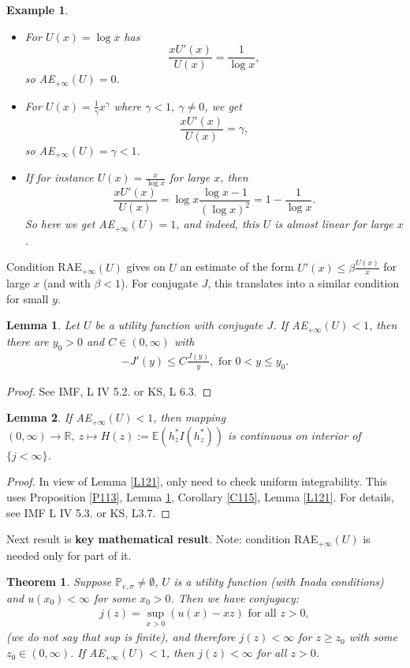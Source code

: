 \documentclass[12pt,a4paper, twoside]{article}
\newtheorem{lem}{Lemma}[section]
\newtheorem{thm}{Theorem}[section]
\newtheorem{exmp}{Example}[section]
\theoremstyle{definition}
\newcommand{\EE}{\mathbb{E}} %
\newcommand{\PP}{\mathbb{P}} %
\begin{document}
\newpage
\begin{exmp} \
\begin{itemize}
\item For $U(x)= \log x$ has $$\frac{x U'(x)}{U(x)}= \frac{1}{\log x},$$ so AE$_{+ \infty}(U)=0$. 
\item For $U(x)= \frac{1}{\gamma}x^\gamma$ where $\gamma <1, \ \gamma \neq 0$, we get $$ \frac{x U'(x)}{U(x)}= \gamma, $$ so AE$_{+ \infty}(U) = \gamma < 1$. 
\item If for instance $U(x)= \frac{x}{\log x}$ for large $x$, then $$ \frac{x U'(x)}{U(x)} = \log x \frac{\log x-1}{(\log x)^2}= 1- \frac{1}{\log x}.$$ So here we get AE$_{+ \infty}(U)=1$, and indeed, this $U$ is almost linear for large $x$.
\end{itemize}
\end{exmp}
Condition RAE$_{+ \infty}(U)$ gives on $U$ an estimate of the form $U'(x) \leq \beta \frac{U(x)}{x}$ for large $x$ (and with $\beta <1$). For conjugate $J$,  this translates into a similar condition for small $y$. 
\begin{lem} \label{L122} Let $U$ be a utility function with conjugate $J$. If AE$_{+ \infty} (U) < 1$, then there are $y_0 >0$ and $C \in (0, \infty)$ with 
\begin{align*}
-J'(y) \leq C \frac{J(y)}{y}, \text{ for } 0 < y \leq y_0.
\end{align*}
\end{lem}
\begin{proof}
See IMF, L IV 5.2. or KS, L 6.3.
\end{proof}
\begin{lem} \label{L123} If AE$_{+ \infty}(U) < 1$, then mapping $(0, \infty) \to \mathbb{R}, \ z \mapsto H(z):= \EE(h_z^* I (h_z^*))$ is continuous on interior of $\{j < \infty\}$. 
\end{lem}
\begin{proof}
In view of Lemma \ref{L121}, only need to check uniform integrability. This uses Proposition \ref{P113}, Lemma \ref{L122}, Corollary \ref{C115}, Lemma \ref{L121}. For details, see IMF L IV 5.3. or KS, L3.7. 
\end{proof}
Next result is \textbf{key mathematical result}. Note: condition RAE$_{+ \infty}(U)$ is needed only for part of it.
\newpage
\begin{thm} \label{T124} Suppose $\PP_{e, \sigma} \neq \emptyset$, $U$ is a utility function (with Inada conditions) and $u(x_0) < \infty$ for some $x_0 >0$. Then we have conjugacy:
\begin{align*} \label{121}
j(z)= \sup_{x >0} (u(x)-xz) \text{ for all } z>0, \tag{13.1} 
\end{align*}
(we do not say that sup is finite), and therefore $j(z) < \infty$ for $z \geq z_0$ with some $z_0 \in (0, \infty)$. If AE$_{+ \infty}(U) < 1$, then $j(z) < \infty$ for all $z>0$. 
\end{thm}
\end{document}
